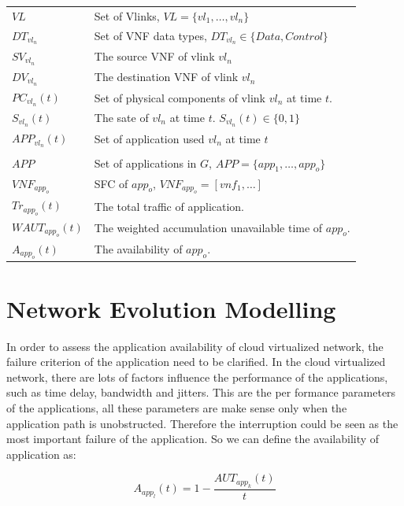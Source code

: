 \documentclass[journal]{IEEEtran}
\begin{document}
\begin{table}[!t]
\begin{tabular}{|>{\raggedright\arraybackslash}p{1.4cm}||>{\raggedright\arraybackslash}p{6.4cm}|}
			$VL$	& Set of Vlinks, $VL = \{vl_1,\dots,vl_n\}$ \\ 
			$DT_{vl_n}$	& Set of VNF data types, $DT_{vl_n} \in \{Data, Control\}$\\
			$SV_{vl_n}$	& The source VNF of vlink $vl_n$ \\
			$DV_{vl_n}$	& The destination VNF of vlink $vl_n$ \\
			$PC_{vl_n}(t)$	& Set of physical components of vlink $vl_n$ at time $t$.\\
			$S_{vl_n}(t)$	& The sate of $vl_n$ at time $t$. $S_{vl_n}(t) \in \{0,1\}$\\
			$APP_{vl_n}(t)$	& Set of application used $vl_n$ at time $t$\\
			\hline
			\multicolumn{2}{|c|}{Applications State}\\
			\hline
			$APP$	& Set of applications in $G$, $APP = \{app_1,\dots, app_o\}$\\
			$VNF_{app_o}$	& SFC of $app_o$, $VNF_{app_o} = [vnf_1,\dots]$ \\
			$Tr_{app_o}(t)$	& The total traffic of application. \\
			$WAUT_{app_o}(t)$ & The weighted accumulation unavailable time of $app_o$. \\
			$A_{app_o}(t)$	& The availability of $app_o$.\\
			\hline
		\end{tabular}
	\end{table}

    \section{Network Evolution Modelling}

    In order to assess the application availability of cloud virtualized network, the failure criterion of the application need to be clarified. In the cloud virtualized network, there are lots of factors influence the performance of the applications, such as time delay, bandwidth and jitters. This are the per formance parameters of the applications, all these parameters are make sense only when the application path is unobstructed. Therefore the interruption could be seen as the most important failure of the application. So we can define the availability of application as:

    \begin{equation}
    	A_{app_l}(t) = 1 - \frac{AUT_{app_k}(t)}{t}
    \end{equation}
\end{document}
